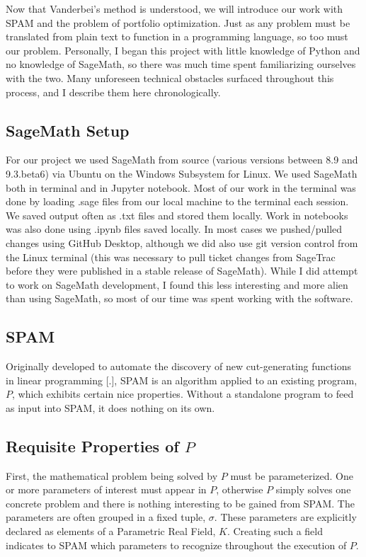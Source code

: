 \documentclass{article}
\begin{document}
Now that Vanderbei's method is understood, we will introduce our work with SPAM and the problem of portfolio optimization. Just as any problem must be translated from plain text to function in a programming language, so too must our problem. Personally, I began this project with little knowledge of Python and no knowledge of SageMath, so there was much time spent familiarizing ourselves with the two. Many unforeseen technical obstacles surfaced throughout this process, and I describe them here chronologically.

\subsection{SageMath Setup}

For our project we used SageMath from source (various versions between 8.9 and 9.3.beta6) via Ubuntu on the Windows Subsystem for Linux. We used SageMath both in terminal and in Jupyter notebook. Most of our work in the terminal was done by loading .sage files from our local machine to the terminal each session. We saved output often as .txt files and stored them locally. Work in notebooks was also done using .ipynb files saved locally. In most cases we pushed/pulled changes using GitHub Desktop, although we did also use git version control from the Linux terminal (this was necessary to pull ticket changes from SageTrac before they were published in a stable release of SageMath). While I did attempt to work on SageMath development, I found this less interesting and more alien than using SageMath, so most of our time was spent working with the software. 

\subsection{SPAM}

Originally developed to automate the discovery of new 
cut-generating functions in linear programming [.], 
SPAM is an algorithm applied to an existing program, $P$, which exhibits certain nice properties. Without a standalone program to feed as input into SPAM, it does nothing on its own.

\subsection{Requisite Properties of $P$} 
First, the mathematical problem being solved by $P$ must be parameterized. One or more parameters of interest must appear in $P$, otherwise $P$ simply solves one concrete problem and there is nothing interesting to be gained from SPAM. The parameters are often grouped in a fixed tuple, $\sigma$. These parameters are explicitly declared as elements of a Parametric Real Field, $K$. Creating such a field indicates to SPAM which parameters to recognize throughout the execution of $P$. 
\end{document}
